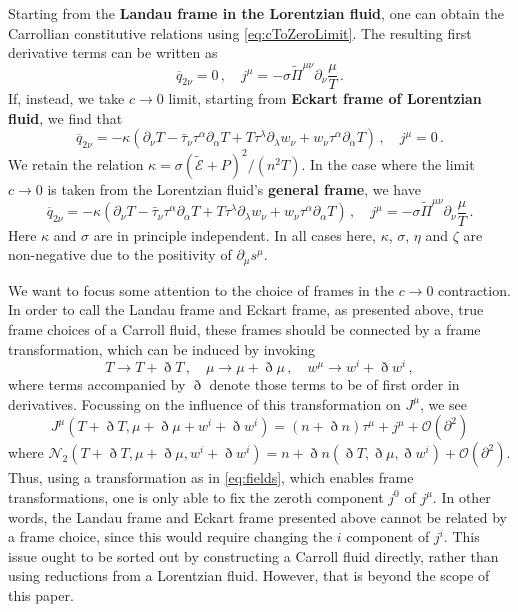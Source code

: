 \documentclass[superscriptaddress,prd,nofootinbib,preprintnumbers,longbibliography,11pt,eqsecnum]{revtex4-1}
\def\d{\partial}
\def\CO{\mathcal{O}}
\begin{document}
Starting from the \textbf{Landau frame in the Lorentzian fluid}, one can obtain the Carrollian constitutive relations using \eqref{eq:cToZeroLimit}. The resulting first derivative terms can be written as
\begin{equation}
	\overline{q}_{2\nu}
	=
	0
	\,,
	\quad
	j^\mu 
	= 
	- \sigma \tilde{\Pi}^{\mu\nu}\d_\nu \frac{\mu}{T}
	\,.
\end{equation}
If, instead, we take $c\to 0$ limit, starting from \textbf{Eckart frame of Lorentzian fluid}, we find that
\begin{equation}
	 \overline{q}_{2\nu} = -\kappa \left(\d_\nu T - \bar\tau_\nu \tau^\alpha \d_\alpha 	T +T \tau^\lambda \d_\lambda w_\nu + w_\nu \tau^\alpha \d_\alpha T  \right)
	 \,,
	 \quad
	 j^{\mu}
	 =
	 0
	 \,.
\end{equation}
We retain the relation $\kappa=\sigma(\tilde{\mathcal{E}}+P)^{2}/(n^{2}T)$. In the case where the limit $c\to 0$ is taken from the Lorentzian fluid's \textbf{general frame}, we have
\begin{equation}
	\overline{q}_{2\nu} = -\kappa \left(\d_\nu T - \bar\tau_\nu \tau^\alpha \d_\alpha 	T +T \tau^\lambda \d_\lambda w_\nu + w_\nu \tau^\alpha \d_\alpha T  \right)
	\,,
	\quad
	j^\mu 
	= 
	- \sigma \tilde{\Pi}^{\mu\nu}\d_\nu \frac{\mu}{T}
	 \,.
\end{equation}
Here $\kappa$ and $\sigma$ are in principle independent. In all cases here, $\kappa$, $\sigma$, $\eta$ and $\zeta$ are non-negative due to the positivity of $\d_\mu s^\mu$.

We want to focus some attention to the choice of frames in the $c\to0$ contraction. In order to call the Landau frame and Eckart frame, as presented above, true frame choices of a Carroll fluid, these frames should be connected by a frame transformation, which can be induced by invoking \cite{Kovtun:2012rj}
\begin{equation}\label{eq:fields}
	T\to T+\eth T
	\,,
	\quad
	\mu
	\to
	\mu+\eth\mu 
	\,,
	\quad
	w^{\mu}
	\to
	w^{i}	
	+
	\eth w^{i}
	\,,
\end{equation}
where terms accompanied by $\eth$ denote those terms to be of first order in derivatives. Focussing on the influence of this transformation on $J^{\mu}$, we see
\begin{equation}
  J^\mu(T+ \eth T,\mu + \eth \mu + w^i + \eth w^i) = (n + \eth n) \tau^\mu +j^\mu + \CO(\d^2)
\end{equation}
where $\mathcal{N}_{2}(T+\eth T,\mu+\eth\mu, w^{i}+\eth w^{i})=n+\eth n(\eth T,\eth\mu,\eth w^{i}) + \CO(\d^2)$. 
Thus, using a transformation as in \eqref{eq:fields}, which enables frame transformations, one is only able to fix the zeroth component $j^0$ of $j^{\mu}$. In other words, the Landau frame and Eckart frame presented above cannot be related by a frame choice, since this would require changing the $i$ component of $j^{i}$. This issue ought to be sorted out by constructing a Carroll fluid directly, rather than using reductions from a Lorentzian fluid. However, that is beyond the scope of this paper. 
\end{document}
